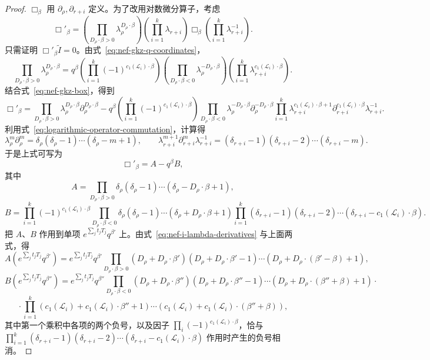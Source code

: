 \begin{proof}
$\Box_\beta$ 用 $\partial_\rho,\partial_{r+i}$ 定义。为了改用对数微分算子，考虑
\[
\Box'_\beta=
\left(\prod_{D_\rho\cdot\beta>0}\lambda_\rho^{D_\rho\cdot\beta}\right)
\left(\prod_{i=1}^k\lambda_{r+i}\right)
\Box_\beta\left(\prod_{i=1}^k\lambda_{r+i}^{-1}\right).
\]
只需证明 $\Box'_\beta\widetilde I=0$。由式~\eqref{eq:nef-gkz-q-coordinates}，
\[
\prod_{D_\rho\cdot\beta>0}\lambda_\rho^{D_\rho\cdot\beta}
=q^\beta\left(\prod_{i=1}^k(-1)^{c_1(\mathcal L_i)\cdot\beta}\right)
\left(\prod_{D_\rho\cdot\beta<0}\lambda_\rho^{-D_\rho\cdot\beta}\right)
\left(\prod_{i=1}^k\lambda_{r+i}^{c_1(\mathcal L_i)\cdot\beta}\right).
\]
结合式~\eqref{eq:nef-gkz-box}，得到
\[
\Box'_\beta=
\prod_{D_\rho\cdot\beta>0}\lambda_\rho^{D_\rho\cdot\beta}\partial_\rho^{D_\rho\cdot\beta}
-q^\beta\left(\prod_{i=1}^k(-1)^{c_1(\mathcal L_i)\cdot\beta}\right)
\prod_{D_\rho\cdot\beta<0}\lambda_\rho^{-D_\rho\cdot\beta}\partial_\rho^{-D_\rho\cdot\beta}
\prod_{i=1}^k\lambda_{r+i}^{c_1(\mathcal L_i)\cdot\beta+1}
\partial_{r+i}^{c_1(\mathcal L_i)\cdot\beta}\lambda_{r+i}^{-1}.
\]
利用式~\eqref{eq:logarithmic-operator-commutation}，计算得
\[
\lambda_\rho^m\partial_\rho^m=\delta_\rho(\delta_\rho-1)\cdots(\delta_\rho-m+1),
\qquad
\lambda_{r+i}^{m+1}\partial_{r+i}^m\lambda_{r+i}^{-1}
=(\delta_{r+i}-1)(\delta_{r+i}-2)\cdots(\delta_{r+i}-m).
\]
于是上式可写为
\begin{equation}\label{eq:nef-normalized-box}
\Box'_\beta=A-q^\beta B,
\end{equation}
其中
\[
A=\prod_{D_\rho\cdot\beta>0}\delta_\rho(\delta_\rho-1)\cdots(\delta_\rho-D_\rho\cdot\beta+1),
\]
\[
B=\prod_{i=1}^k(-1)^{c_1(\mathcal L_i)\cdot\beta}
\prod_{D_\rho\cdot\beta<0}\delta_\rho(\delta_\rho-1)\cdots(\delta_\rho+D_\rho\cdot\beta+1)
\prod_{i=1}^k(\delta_{r+i}-1)(\delta_{r+i}-2)\cdots(\delta_{r+i}-c_1(\mathcal L_i)\cdot\beta).
\]
把 $A$、$B$ 作用到单项 $e^{\sum_jt_jT_j}q^{\beta'}$ 上。由式~\eqref{eq:nef-i-lambda-derivatives} 与上面两式，得
\[
A\left(e^{\sum_jt_jT_j}q^{\beta'}\right)
=e^{\sum_jt_jT_j}q^{\beta'}
\prod_{D_\rho\cdot\beta>0}(D_\rho+D_\rho\cdot\beta')(D_\rho+D_\rho\cdot\beta'-1)\cdots(D_\rho+D_\rho\cdot(\beta'-\beta)+1),
\]
\[
B\left(e^{\sum_jt_jT_j}q^{\beta''}\right)
=e^{\sum_jt_jT_j}q^{\beta''}
\prod_{D_\rho\cdot\beta<0}(D_\rho+D_\rho\cdot\beta'')(D_\rho+D_\rho\cdot\beta''-1)\cdots(D_\rho+D_\rho\cdot(\beta''+\beta)+1)\cdot{}
\]
\[
{}\cdot\prod_{i=1}^k(c_1(\mathcal L_i)+c_1(\mathcal L_i)\cdot\beta''+1)\cdots(c_1(\mathcal L_i)+c_1(\mathcal L_i)\cdot(\beta''+\beta)),
\]
其中第一个乘积中各项的两个负号，以及因子 $\prod_i(-1)^{c_1(\mathcal L_i)\cdot\beta}$，恰与 $\prod_{i=1}^k(\delta_{r+i}-1)(\delta_{r+i}-2)\cdots(\delta_{r+i}-c_1(\mathcal L_i)\cdot\beta)$ 作用时产生的负号相消。

\end{proof}
